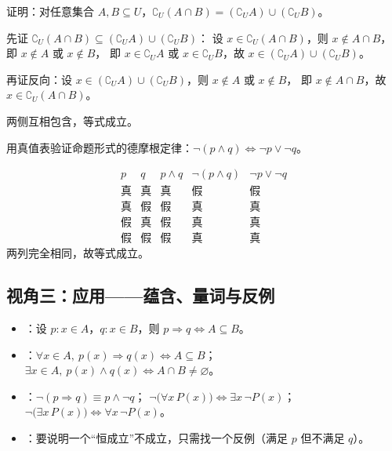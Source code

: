 \begin{explore}
\begin{example}
证明：对任意集合 $A,B\subseteq U$，$\complement_U(A\cap B)=(\complement_U A)\cup(\complement_U B)$。
\end{example}
\begin{solution}
先证 $\complement_U(A\cap B)\subseteq(\complement_U A)\cup(\complement_U B)$：
设 $x\in\complement_U(A\cap B)$，则 $x\notin A\cap B$，即 $x\notin A$ 或 $x\notin B$，
即 $x\in\complement_U A$ 或 $x\in\complement_U B$，故 $x\in(\complement_U A)\cup(\complement_U B)$。

再证反向：设 $x\in(\complement_U A)\cup(\complement_U B)$，则 $x\notin A$ 或 $x\notin B$，
即 $x\notin A\cap B$，故 $x\in\complement_U(A\cap B)$。

两侧互相包含，等式成立。
\end{solution}

\begin{problem}
用真值表验证命题形式的德摩根定律：$\neg(p\land q)\iff\neg p\lor\neg q$。
\end{problem}
\begin{solution}
\[
\begin{array}{c|c|c|c|c}
p & q & p\land q & \neg(p\land q) & \neg p\lor\neg q \\ \hline
\text{真} & \text{真} & \text{真} & \text{假} & \text{假} \\
\text{真} & \text{假} & \text{假} & \text{真} & \text{真} \\
\text{假} & \text{真} & \text{假} & \text{真} & \text{真} \\
\text{假} & \text{假} & \text{假} & \text{真} & \text{真}
\end{array}
\]
两列完全相同，故等式成立。
\end{solution}

\subsection{视角三：应用——蕴含、量词与反例}

\begin{itemize}
  \item {}：设 $p:x\in A$，$q:x\in B$，则 $p\Rightarrow q\iff A\subseteq B$。
  \item {}：$\forall x\in A,\ p(x)\Rightarrow q(x)\iff A\subseteq B$；
        $\exists x\in A,\ p(x)\land q(x)\iff A\cap B\neq\varnothing$。
  \item {}：$\neg(p\Rightarrow q)\equiv p\land\neg q$；
        $\neg\big(\forall x\,P(x)\big)\iff\exists x\,\neg P(x)$；
        $\neg\big(\exists x\,P(x)\big)\iff\forall x\,\neg P(x)$。
  \item {}：要说明一个“恒成立”不成立，只需找一个反例（满足 $p$ 但不满足 $q$）。
\end{itemize}


\end{explore}
